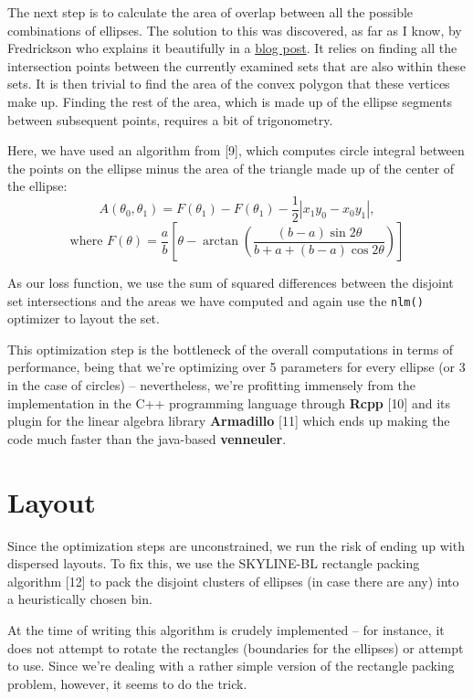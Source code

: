 \documentclass[
  headsepline=true,headings=standardclasses%
]{scrartcl}
\theoremstyle{definition}
\theoremstyle{definition}
\theoremstyle{remark}
\begin{document}
The next step is to calculate the area of overlap between all the
possible combinations of ellipses. The solution to this was discovered,
as far as I know, by Fredrickson who explains it beautifully in a
\href{http://www.benfrederickson.com/calculating-the-intersection-of-3-or-more-circles/}{blog
post}. It relies on finding all the intersection points between the
currently examined sets that are also within these sets. It is then
trivial to find the area of the convex polygon that these vertices make
up. Finding the rest of the area, which is made up of the ellipse
segments between subsequent points, requires a bit of trigonometry.

Here, we have used an algorithm from {[}9{]}, which computes circle
integral between the points on the ellipse minus the area of the
triangle made up of the center of the ellipse: \[
A(\theta_0, \theta_1) = F(\theta_1) - F(\theta_1) -
\frac{1}{2}|x_1y_0 - x_0y_1|,
\] \[
\text{where } F(\theta) = \frac{a}{b}\left[ \theta -
\arctan{\left(\frac{(b - a)\sin{2\theta}}{b + a +(b - a )\cos{2\theta}} \right)}
\right]
\]

As our loss function, we use the sum of squared differences between the
disjoint set intersections and the areas we have computed and again use
the \texttt{nlm()} optimizer to layout the set.

This optimization step is the bottleneck of the overall computations in
terms of performance, being that we're optimizing over 5 parameters for
every ellipse (or 3 in the case of circles) -- nevertheless, we're
profitting immensely from the implementation in the C++ programming
language through \textbf{Rcpp} {[}10{]} and its plugin for the linear
algebra library \textbf{Armadillo} {[}11{]} which ends up making the
code much faster than the java-based \textbf{venneuler}.

\section{Layout}\label{layout}

Since the optimization steps are unconstrained, we run the risk of
ending up with dispersed layouts. To fix this, we use the SKYLINE-BL
rectangle packing algorithm {[}12{]} to pack the disjoint clusters of
ellipses (in case there are any) into a heuristically chosen bin.

At the time of writing this algorithm is crudely implemented -- for
instance, it does not attempt to rotate the rectangles (boundaries for
the ellipses) or attempt to use. Since we're dealing with a rather
simple version of the rectangle packing problem, however, it seems to do
the trick.
\end{document}
